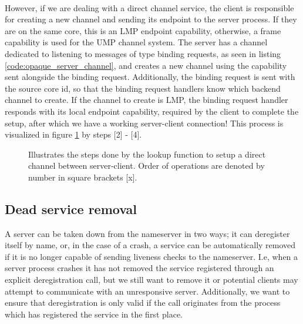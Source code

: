 \paragraph{}

However, if we are dealing with a direct channel service, the client is responsible for creating a new channel and sending its endpoint to the server process. If they are on the same core, this is an LMP endpoint capability, otherwise, a frame capability is used for the UMP channel system. The server has a channel dedicated to listening to messages of type binding requests, as seen in listing \ref{code:opaque_server_channel}, and creates a new channel using the capability sent alongside the binding request. Additionally, the binding request is sent with the source core id, so that the binding request handlers know which backend channel to create. If the channel to create is LMP, the binding request handler responds with its local endpoint capability, required by the client to complete the setup, after which we have a working server-client connection! This process is visualized in figure \ref{fig:lookup} by steps [2] - [4].

\vspace{0.5in}
\begin{figure}[h!]
    \centering
        \scalebox{0.6}{
            
        }
    \caption{Illustrates the steps done by the lookup function to setup a direct channel between server-client. Order of operations are denoted by number in square brackets [x].}
    \label{fig:lookup}
\end{figure}





\subsection{Dead service removal}\label{dead_service_removal}
A server can be taken down from the nameserver in two ways; it can deregister itself by name, or, in the case of a crash, a service can be automatically removed if it is no longer capable of sending liveness checks to the nameserver. I.e, when a server process crashes it has not removed the service registered through an explicit deregistration call, but we still want to remove it or potential clients may attempt to communicate with an unresponsive server. Additionally, we want to ensure that deregistration is only valid if the call originates from the process which has registered the service in the first place. 
